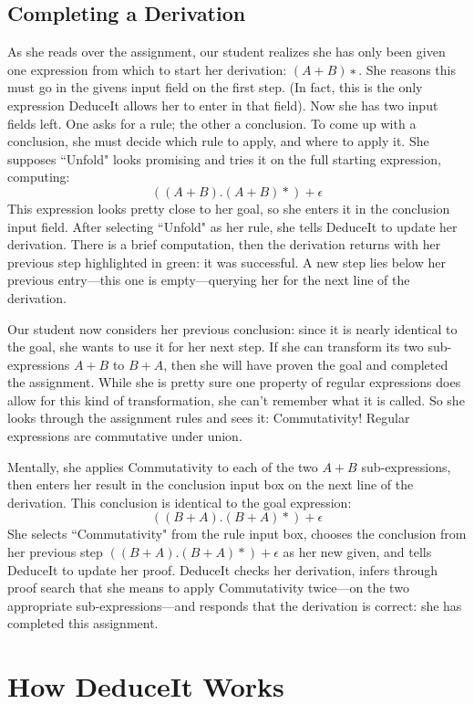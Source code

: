 \documentclass{sigchi}
\begin{document}
\subsection{Completing a Derivation}
As she reads over the assignment, our student realizes she has only been given one expression from which to start her derivation: $(A+B)∗$. She reasons this must go in the givens input field on the first step. (In fact, this is the only expression DeduceIt allows her to enter in that field). Now she has two input fields left. One asks for a rule; the other a conclusion. To come up with a conclusion, she must decide which rule to apply, and where to apply it. She supposes ``Unfold" looks promising and tries it on the full starting expression, computing:
$$((A + B).(A + B)*)+\epsilon$$
This expression looks pretty close to her goal, so she enters it in the conclusion input field. After selecting ``Unfold" as her rule, she tells DeduceIt to update her derivation. There is a brief computation, then the derivation returns with her previous step highlighted in green: it was successful. A new step lies below her previous entry---this one is empty---querying her for the next line of the derivation.

Our student now considers her previous conclusion: since it is nearly identical to the goal, she wants to use it for her next step. If she can transform its two sub-expressions $A+B$ to $B+A$, then she will have proven the goal and completed the assignment. While she is pretty sure one property of regular expressions does allow for this kind of transformation, she can't remember what it is called. So she looks through the assignment rules and sees it: Commutativity! Regular expressions are commutative under union.

Mentally, she applies Commutativity to each of the two $A+B$ sub-expressions, then enters her result in the conclusion input box on the next line of the derivation. This conclusion is identical to the goal expression: 
$$((B+A).(B+A)*)+\epsilon$$
She selects ``Commutativity" from the rule input box, chooses the conclusion from her previous step $((B+A).(B+A)*)+\epsilon$ as her new given, and tells DeduceIt to  update her proof. DeduceIt checks her derivation, infers through proof search that she means to apply Commutativity twice---on the two appropriate sub-expressions---and responds that the derivation is correct: she has completed this assignment.


\section{How DeduceIt Works}
\end{document}
